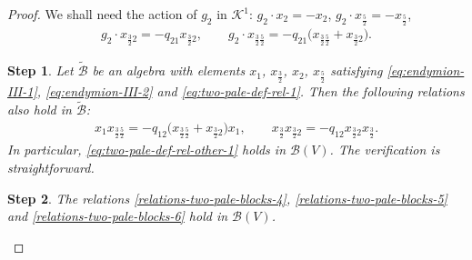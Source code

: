 \documentclass[pdftex]{sigma}
\numberwithin{equation}{section}
\newtheorem{stepiii}{Step}
\newcommand{\toba}{\mathscr B}
\newcommand{\wtoba}{\widetilde{\mathscr B}}
\newcommand{\K}{{\mathcal{K}}}
\newcommand{\tresdos}{\frac{3}{2}}
\newcommand{\cincodos}{\frac{5}{2}}
\begin{document}
\begin{proof}
We shall need the action of $g_2$ in $\K^1$: $g_2\cdot x_{2} = -x_{2}$,
$g_2\cdot x_{\cincodos} = -x_{\cincodos}$,
\begin{align*}
g_2 \cdot x_{\tresdos2} = -q_{21} x_{\tresdos2} , \qquad
g_2 \cdot x_{\tresdos\cincodos} = -q_{21} \big(x_{\tresdos\cincodos}+x_{\tresdos2}\big).
\end{align*}

\begin{stepiii}
Let $\wtoba$ be an algebra with elements $x_1$, $x_{\tresdos}$, $x_2$, $x_\cincodos$ satisfying
\eqref{eq:endymion-III-1}, \eqref{eq:endymion-III-2} and \eqref{eq:two-pale-def-rel-1}.
Then the following relations also hold in $\wtoba$:
\begin{align}\label{eq:two-pale-def-rel-other-1}
x_1x_{\tresdos\cincodos} = -q_{12}\big(x_{\tresdos\cincodos}+x_{\tresdos2}\big)x_1,\qquad
x_{\tresdos}x_{\tresdos2}=-q_{12}x_{\tresdos2}x_{\tresdos}.
\end{align}
In particular, \eqref{eq:two-pale-def-rel-other-1} holds in $\toba(V)$. The verification is straightforward.
\end{stepiii}

\begin{stepiii}%
The relations \eqref{relations-two-pale-blocks-4}, \eqref{relations-two-pale-blocks-5} and \eqref{relations-two-pale-blocks-6}
hold in $\toba(V)$.
\end{stepiii}


\end{proof}
\end{document}
